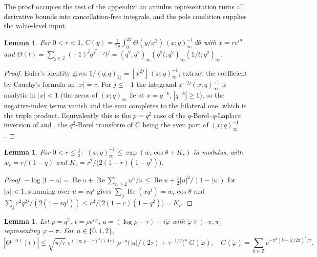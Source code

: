 \documentclass[11pt]{article}
\theoremstyle{plain}
\newtheorem{lemma}[theorem]{Lemma}
\theoremstyle{definition}
\theoremstyle{remark}
\newcommand{\Z}{\mathbb{Z}}
\begin{document}
The proof occupies the rest of the appendix: an annulus representation turns all derivative bounds
into cancellation-free integrals, and the pole condition supplies the value-level input.

\begin{lemma}\label{app:rep}
For $0<r<1$,
$C(y)=\frac1{2\pi}\int_0^{2\pi}\Theta(y/x^2)\,(x;q)_\infty^{-1}\,d\theta$ with $x=re^{i\theta}$ and
$\Theta(t)=\sum_{j\in\Z}(-1)^jq^{j^2+j}t^j=(q^2;q^2)_\infty(q^2t;q^2)_\infty(1/t;q^2)_\infty$.
\end{lemma}

\begin{proof}
Euler's identity gives $1/(q;q)_{2j}=[x^{2j}]\,(x;q)_\infty^{-1}$; extract the coefficient by
Cauchy's formula on $|x|=r$. For $j\le-1$ the integrand $x^{-2j}(x;q)_\infty^{-1}$ is analytic in
$|x|<1$ (the zeros of $(x;q)_\infty$ lie at $x=q^{-k}$, $|q^{-k}|\ge1$), so the negative-index terms
vanish and the sum completes to the bilateral one, which is the triple product. Equivalently this is
the $p=q^2$ case of the $q$-Borel--$q$-Laplace inversion of \cite{Zhang2000} and
\cite[Lemma~1]{Morita2011}, the $q^2$-Borel transform of $C$ being the even part of
$(x;q)_\infty^{-1}$.
\end{proof}

\begin{lemma}\label{app:euler}
For $0<r\le\tfrac12$: $\ (x;q)_\infty^{-1}\le\exp(w_r\cos\theta+K_r)$ in modulus, with
$w_r=r/(1-q)$ and $K_r=r^2/\bigl(2(1-r)(1-q^2)\bigr)$.
\end{lemma}

\begin{proof}
$-\log|1-u|=\operatorname{Re}u+\operatorname{Re}\sum_{n\ge2}u^n/n
\le\operatorname{Re}u+\tfrac12|u|^2/(1-|u|)$ for $|u|<1$; summing over $u=xq^j$ gives
$\sum_j\operatorname{Re}(xq^j)=w_r\cos\theta$ and
$\sum_j r^2q^{2j}/(2(1-rq^j))\le r^2/\bigl(2(1-r)(1-q^2)\bigr)=K_r$.
\end{proof}

\begin{lemma}\label{app:theta}
Let $p=q^2$, $t=\rho e^{i\varphi}$, $a=(\log\rho-\tau)+i\tilde\varphi$ with
$\tilde\varphi\in(-\pi,\pi]$ representing $\varphi+\pi$. For $n\in\{0,1,2\}$,
\[
 |\Theta^{(n)}(t)|\le\sqrt{\pi/\tau}\;e^{(\log\rho-\tau)^2/(4\tau)}\,\rho^{-n}
 \bigl(|a|/(2\tau)+\tau^{-1/2}\bigr)^n\,G(\tilde\varphi),\quad
 G(\tilde\varphi)=\sum_{k\in\Z}e^{-\pi^2(k-\tilde\varphi/2\pi)^2/\tau}.
\]
\end{lemma}
\end{document}
